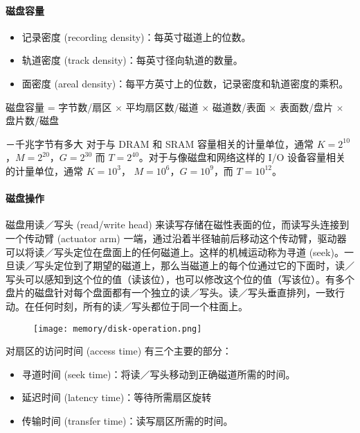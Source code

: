\paragraph{磁盘容量}
\begin{itemize}
    \item 记录密度 (recording density)：每英寸磁道上的位数。
    \item 轨道密度 (track density)：每英寸径向轨道的数量。
    \item 面密度 (areal density)：每平方英寸上的位数，记录密度和轨道密度的乘积。
\end{itemize}
\begin{center}
    磁盘容量 = 字节数/扇区 $\times$ 平均扇区数/磁道 $\times$ 磁道数/表面 $\times$ 表面数/盘片 $\times$ 盘片数/磁盘
\end{center}
\begin{sidenote}{－千兆字节有多大}
    对于与 DRAM 和 SRAM 容量相关的计量单位，通常 $K=2^{10}$，$M=2^{20}$，$G=2^{30}$ 而
    $T= 2^{40}$。对于与像磁盘和网络这样的 I/O 设备容量相关的计量单位，通常 $K = 10^{3}$，
    $M= 10^{6}$，$G = 10^{9}$，而 $T=10^{12}$。
\end{sidenote}

\paragraph{磁盘操作}

磁盘用读／写头 (read/write head) 来读写存储在磁性表面的位，而读写头连接到一个传动臂 (actuator arm) 一端，通过沿着半径轴前后移动这个传动臂，驱动器可以将读／写头定位在盘面上的任何磁道上。这样的机械运动称为寻道 (seek)。一旦读／写头定位到了期望的磁道上，那么当磁道上的每个位通过它的下面时，读／写头可以感知到这个位的值（读该位），也可以修改这个位的值（写该位）。有多个盘片的磁盘针对每个盘面都有一个独立的读／写头。读／写头垂直排列，一致行动。在任何时刻，所有的读／写头都位于同一个柱面上。

\begin{figure}[H]
    \centering
    \texttt{[image: memory/disk-operation.png]}
\end{figure}

对扇区的访问时间 (access time) 有三个主要的部分：
\begin{itemize}
    \item 寻道时间 (seek time)：将读／写头移动到正确磁道所需的时间。
    \item 延迟时间 (latency time)：等待所需扇区旋转
    \item 传输时间 (transfer time)：读写扇区所需的时间。
\end{itemize}

